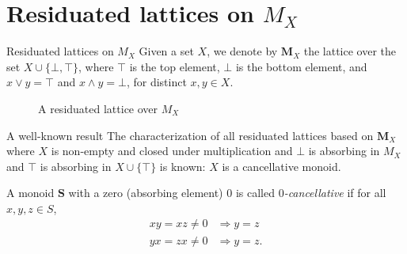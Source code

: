 \documentclass[professionalfont, 12pt]{beamer} %
\theoremstyle{plain}
\theoremstyle{definition}
\begin{document}
\section{Residuated lattices on \texorpdfstring{$M_X$}{MX}}

\begin{frame}{Residuated lattices on $M_X$}
Given a set $X$, we denote by $\mathbf{M}_X$ the lattice over the set $X\cup \{\bot, \top\}$, where $\top$ is the top element, $\bot$ is the bottom element, and $x\vee y=\top$ and $x \wedge y=\bot$, for distinct $x,y \in X$.

\begin{figure}[h]
\centering
{}
\caption{A residuated lattice over $M_X$}
\end{figure}
\end{frame}

\begin{frame}
    \begin{block}{A well-known result}
        The characterization of all residuated lattices based on $\mathbf{M}_X$ where $X$ is non-empty and closed under multiplication and $\bot$ is absorbing in $M_X$ and $\top$ is absorbing in $X \cup \{\top\}$ is known: $X$ is a cancellative monoid.
    \end{block}
    \pause
    
    A monoid $\mathbf{S}$ with a zero (absorbing element) $0$ is called \emph{$0$-cancellative} if for all $x, y, z \in S$,
    \begin{align*}
        xy = xz \neq 0 & \Rightarrow y = z\\
        yx = zx \neq 0 & \Rightarrow y = z.
    \end{align*}
    
\end{frame}
\end{document}
